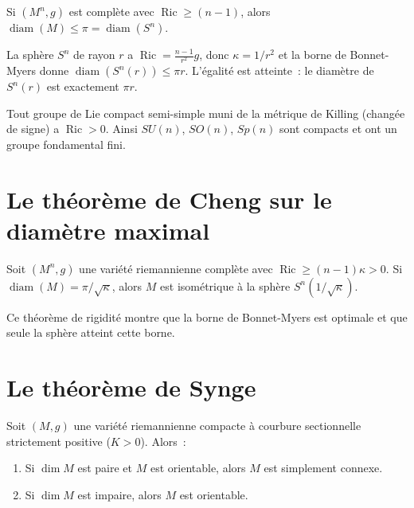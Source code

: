 \begin{corollaire}
Si $(M^n, g)$ est compl\`ete avec $\operatorname{Ric} \geq (n-1)$, alors
$\operatorname{diam}(M) \leq \pi = \operatorname{diam}(S^n)$.
\end{corollaire}

\begin{exemple}
La sph\`ere $S^n$ de rayon $r$ a $\operatorname{Ric} = \frac{n-1}{r^2} g$,
donc $\kappa = 1/r^2$ et la borne de Bonnet-Myers donne $\operatorname{diam}(S^n(r))
\leq \pi r$. L'\'egalit\'e est atteinte~: le diam\`etre de $S^n(r)$ est
exactement $\pi r$.
\end{exemple}

\begin{exemple}
Tout groupe de Lie compact semi-simple muni de la m\'etrique de Killing (chang\'ee
de signe) a $\operatorname{Ric} > 0$. Ainsi $SU(n)$, $SO(n)$, $Sp(n)$ sont compacts
et ont un groupe fondamental fini.
\end{exemple}

\section{Le th\'eor\`eme de Cheng sur le diam\`etre maximal}

\begin{theoreme}[Cheng]
\label{thm:cheng}
Soit $(M^n, g)$ une vari\'et\'e riemannienne compl\`ete avec
$\operatorname{Ric} \geq (n-1)\kappa > 0$. Si $\operatorname{diam}(M) = \pi/\sqrt{\kappa}$,
alors $M$ est isom\'etrique \`a la sph\`ere $S^n(1/\sqrt{\kappa})$.
\end{theoreme}

\begin{remarque}
Ce th\'eor\`eme de rigidit\'e montre que la borne de Bonnet-Myers est optimale et que
seule la sph\`ere atteint cette borne.
\end{remarque}

\section{Le th\'eor\`eme de Synge}

\begin{theoreme}[Synge]
\label{thm:synge}
Soit $(M, g)$ une vari\'et\'e riemannienne compacte \`a courbure sectionnelle
strictement positive ($K > 0$). Alors~:
\begin{enumerate}
    \item Si $\dim M$ est paire et $M$ est orientable, alors $M$ est simplement connexe.
    \item Si $\dim M$ est impaire, alors $M$ est orientable.
\end{enumerate}
\end{theoreme}

